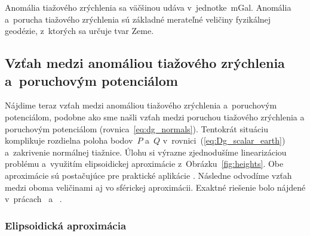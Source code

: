\documentclass[a4paper,12pt]{book}
\begin{document}
Anomália tiažového zrýchlenia sa väčšinou udáva v~jednotke~mGal.  Anomália 
a~porucha tiažového zrýchlenia sú základné merateľné veličiny fyzikálnej 
geodézie, z~ktorých sa určuje tvar Zeme.

\subsection{Vzťah medzi anomáliou tiažového zrýchlenia a~poruchovým 
potenciálom}

Nájdime teraz vzťah medzi anomáliou tiažového zrýchlenia a~poruchovým 
potenciálom, podobne ako sme našli vzťah medzi poruchou tiažového zrýchlenia 
a poruchovým potenciálom (rovnica~\ref{eq:dg_normals}).  Tentokrát situáciu 
komplikuje rozdielna poloha bodov~$P$ a~$Q$ 
v~rovnici~(\ref{eq:Dg_scalar_earth}) a~zakrivenie normálnej tiažnice.  Úlohu si 
výrazne zjednodušíme linearizáciou problému a~využitím elipsoidickej 
aproximácie z~Obrázku~\ref{fig:heights}.  Obe aproximácie sú postačujúce pre 
praktické aplikácie \parencite{MoritzAdvancedGeodesy}.  Následne odvodíme vzťah 
medzi oboma veličinami aj vo sférickej aproximácii.  Exaktné riešenie bolo 
nájdené v~prácach~\textcite{Meissl1971b} a~\textcite{Borre_chapter8} 
\parencite[pozri tiež napríklad][]{MoritzAdvancedGeodesy,Janak2006}.

\subsubsection{Elipsoidická aproximácia}
\end{document}
